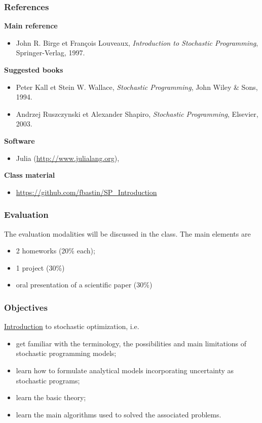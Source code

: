 \documentclass{beamer}
\begin{document}
\begin{frame}
\frametitle{References}

{\bf Main reference}
\begin{itemize}
\item
John R. Birge et François Louveaux, {\sl Introduction to Stochastic
  Programming}, Springer-Verlag, 1997.
\end{itemize}

{\bf Suggested books}
\begin{itemize}
\item
Peter Kall et Stein W. Wallace, {\sl Stochastic Programming}, John
  Wiley \& Sons, 1994.
\item
Andrzej Ruszczynski et Alexander Shapiro, {\sl Stochastic
  Programming}, Elsevier, 2003.
\end{itemize}

{\bf Software}
\begin{itemize}
\item
Julia (\url{http://www.julialang.org}),
\end{itemize}

{\bf Class material}
\begin{itemize}
	\item
	\url{https://github.com/fbastin/SP_Introduction}
\end{itemize}


\end{frame}

\begin{frame}
\frametitle{Evaluation}

The evaluation modalities will be discussed in the class. The main elements are
\begin{itemize}
\item
2 homeworks (20\% each);
\item
1 project (30\%)
\item
oral presentation of a scientific paper (30\%)
\end{itemize}

\end{frame}

\begin{frame}
\frametitle{Objectives}
 
\underline{Introduction} to stochastic optimization, i.e.
\begin{itemize}
\item
get familiar with the terminology, the possibilities and main limitations of stochastic programming models;
\item
learn how to formulate analytical models incorporating uncertainty as stochastic programs;
\item
learn the basic theory;
\item
learn the main algorithms used to solved the associated problems.
\end{itemize}
\end{frame}
\end{document}
